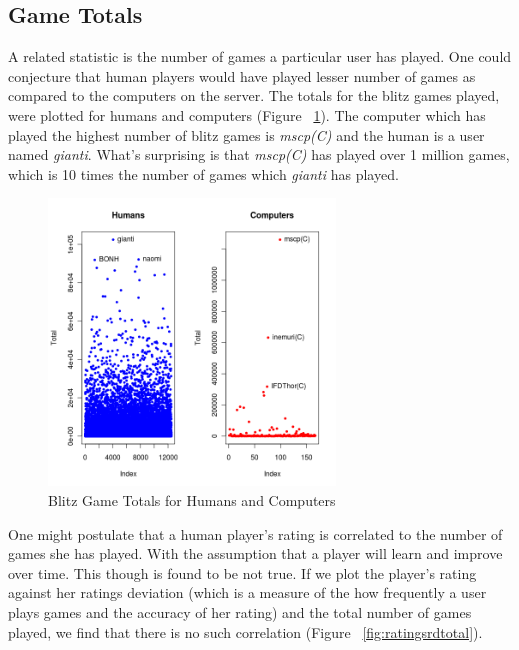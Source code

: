 \documentclass{article}
\begin{document}
\subsection{Game Totals}

A related statistic is the number of games a particular user has played. One could conjecture that human players would have played lesser number of games as compared to the computers on the server. The totals for the blitz games played, were plotted for humans and computers (Figure ~\ref{fig:gametotals}). The computer which has played the highest number of blitz games is {\sl mscp(C)} and the human is a user named {\sl gianti}. What's surprising is that {\sl mscp(C)} has played over 1 million games, which is 10 times the number of games which {\sl gianti} has played.\\


\begin{figure} [htp]
\begin{center}
\includegraphics[width=3in]{game_totals.png}
\end{center}
\caption{Blitz Game Totals for Humans and Computers}
\label{fig:gametotals}
\end{figure}



One might postulate that a human player's rating is correlated to the number of games she has played. With the assumption that a player will learn and improve over time. This though is found to be not true. If we plot the player's rating against her ratings deviation (which is a measure of the how frequently a user plays games and the accuracy of her rating) and the total number of games played, we find that there is no such correlation (Figure ~\ref{fig:ratingsrdtotal}).\\
\end{document}
